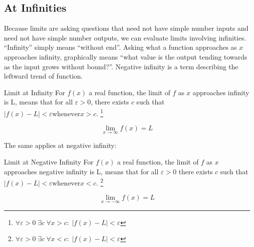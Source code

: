 
\subsection{At Infinities}





Because limits are asking questions that need not have simple number inputs and
need not have simple number outputs, we can evaluate limits involving infinities.
``Infinity'' simply means ``without end''.  Asking what a function approaches as
$x$ approaches infinity, graphically means ``what value is the output tending
towards as the input grows without bound?''.  Negative infinity is a term describing
the leftward trend of function.  


\begin{derivation}{Limit at Infinity}
For $f(x)$ a real function, the limit of $f$ as $x$ approaches infinity is L, 
means that for all  $\varepsilon >0$, there exists $c$ such 
that $|f(x) - L| < \varepsilon \text{whenever} x > c$. \footnote{$\forall \varepsilon > 
0 \; \exists c \; \forall x > c :\; |f(x) - L| < \varepsilon$}

$$\lim _{x\to \infty }f(x)=L$$

\end{derivation}


The same applies at negative infinity:


\begin{derivation}{Limit at Negative Infinity}
For $f(x)$ a real function, the limit of $f$ as $x$ approaches negative infinity is L, 
means that for all $\varepsilon >0$ there exists $c$ such that 
$ |f(x) - L| < \varepsilon \text{whenever} x < c$.  \footnote{$\forall \varepsilon > 
0 \; \exists c \; \forall x < c :\; |f(x) - L| < \varepsilon$}


$$ \lim_{x \to -\infty}f(x) = L$$

\end{derivation}


